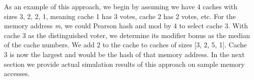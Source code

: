 As an example of this approach, we begin by assuming we have 4 caches with sizes
3, 2, 2, 1, meaning cache 1 has 3 votes, cache 2 has 2 votes, etc. For the
memory address \textit{m}, we could Pearson hash and mod by 4 to select cache 3.
With cache 3 as the distinguished voter, we determine its modifier bonus as the
median of the cache numbers.  We add 2 to the cache to caches of sizes [3, 2, 5,
  1].  Cache 3 is now the largest and would be the hash of that memory
address. In the next section we provide actual simulation results of this
approach on sample memory accesses.

